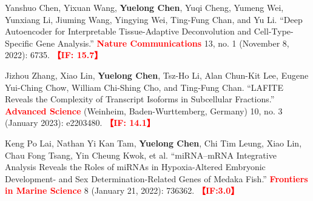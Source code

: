 

\begin{cventries}
\small{

  \begin{cvitems} %
      \item Yanshuo Chen, Yixuan Wang, \textbf{Yuelong Chen}, Yuqi Cheng, Yumeng Wei, Yunxiang Li, Jiuming Wang, Yingying Wei, Ting-Fung Chan, and Yu Li. “Deep Autoencoder for Interpretable Tissue-Adaptive Deconvolution and Cell-Type-Specific Gene Analysis.” \textbf{\textcolor{red}{Nature Communications}} 13, no. 1 (November 8, 2022): 6735. \textbf{\textcolor{red}{【IF: 15.7】}}
      \item Jizhou Zhang, Xiao Lin, \textbf{Yuelong Chen}, Tsz-Ho Li, Alan Chun-Kit Lee, Eugene Yui-Ching Chow, William Chi-Shing Cho, and Ting-Fung Chan. “LAFITE Reveals the Complexity of Transcript Isoforms in Subcellular Fractions.” \textbf{\textcolor{red}{Advanced Science}} (Weinheim, Baden-Wurttemberg, Germany) 10, no. 3 (January 2023): e2203480. \textbf{\textcolor{red}{【IF: 14.1】}}
      \item Keng Po Lai, Nathan Yi Kan Tam, \textbf{Yuelong Chen}, Chi Tim Leung, Xiao Lin, Chau Fong Tsang, Yin Cheung Kwok, et al. “miRNA–mRNA Integrative Analysis Reveals the Roles of miRNAs in Hypoxia-Altered Embryonic Development- and Sex Determination-Related Genes of Medaka Fish.” \textbf{\textcolor{red}{Frontiers in Marine Science}} 8 (January 21, 2022): 736362. \textbf{\textcolor{red}{【IF:3.0】}}

\end{cvitems}}
\end{cventries}
